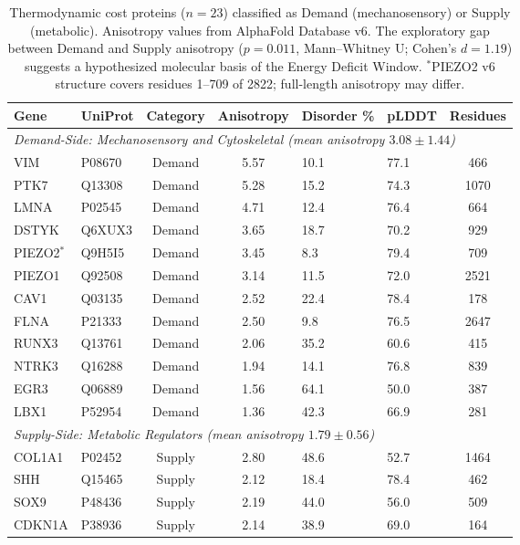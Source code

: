 \begin{table}[h!]
\centering
\caption{Thermodynamic cost proteins ($n=23$) classified as Demand (mechanosensory) or Supply (metabolic). Anisotropy values from AlphaFold Database v6. The exploratory gap between Demand and Supply anisotropy ($p = 0.011$, Mann--Whitney U; Cohen's $d = 1.19$) suggests a hypothesized molecular basis of the Energy Deficit Window. $^*$PIEZO2 v6 structure covers residues 1--709 of 2822; full-length anisotropy may differ.}
\label{tab:thermodynamic_cost_proteins}
\scriptsize
\begin{tabular}{llccllc}
\toprule
\textbf{Gene} & \textbf{UniProt} & \textbf{Category} & \textbf{Anisotropy} & \textbf{Disorder \%} & \textbf{pLDDT} & \textbf{Residues} \\
\midrule
\multicolumn{7}{l}{\textit{Demand-Side: Mechanosensory and Cytoskeletal (mean anisotropy $3.08 \pm 1.44$)}} \\
VIM & P08670 & Demand & 5.57 & 10.1 & 77.1 & 466 \\
PTK7 & Q13308 & Demand & 5.28 & 15.2 & 74.3 & 1070 \\
LMNA & P02545 & Demand & 4.71 & 12.4 & 76.4 & 664 \\
DSTYK & Q6XUX3 & Demand & 3.65 & 18.7 & 70.2 & 929 \\
PIEZO2$^*$ & Q9H5I5 & Demand & 3.45 & 8.3 & 79.4 & 709 \\
PIEZO1 & Q92508 & Demand & 3.14 & 11.5 & 72.0 & 2521 \\
CAV1 & Q03135 & Demand & 2.52 & 22.4 & 78.4 & 178 \\
FLNA & P21333 & Demand & 2.50 & 9.8 & 76.5 & 2647 \\
RUNX3 & Q13761 & Demand & 2.06 & 35.2 & 60.6 & 415 \\
NTRK3 & Q16288 & Demand & 1.94 & 14.1 & 76.8 & 839 \\
EGR3 & Q06889 & Demand & 1.56 & 64.1 & 50.0 & 387 \\
LBX1 & P52954 & Demand & 1.36 & 42.3 & 66.9 & 281 \\
\midrule
\multicolumn{7}{l}{\textit{Supply-Side: Metabolic Regulators (mean anisotropy $1.79 \pm 0.56$)}} \\
COL1A1 & P02452 & Supply & 2.80 & 48.6 & 52.7 & 1464 \\
SHH & Q15465 & Supply & 2.12 & 18.4 & 78.4 & 462 \\
SOX9 & P48436 & Supply & 2.19 & 44.0 & 56.0 & 509 \\
CDKN1A & P38936 & Supply & 2.14 & 38.9 & 69.0 & 164 \\

\end{tabular}
\end{table}
